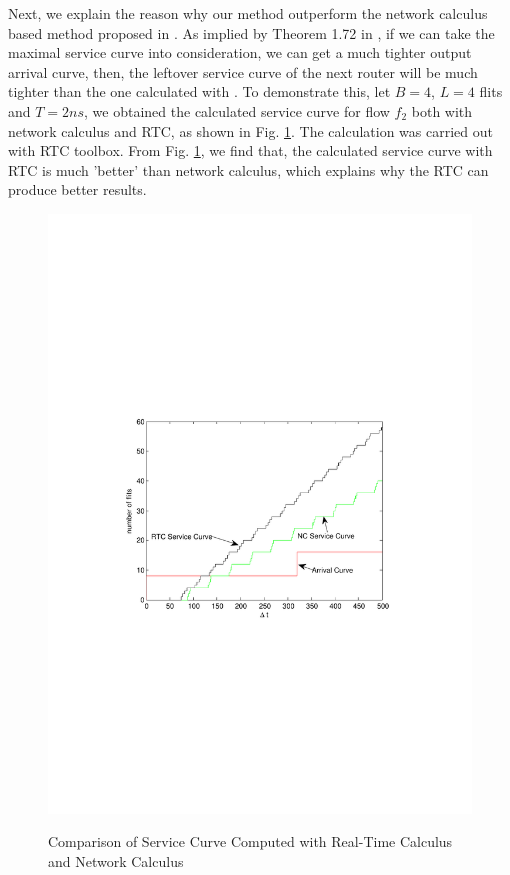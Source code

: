 \documentclass[10pt,journal]{IEEEtran}
\begin{document}
Next, we explain the reason why our method outperform the network calculus based method proposed in \cite{Qian489900}. As implied by Theorem 1.72 in \cite{Boudec2001Network}, if we can take the maximal service curve into consideration, we can get a much tighter output arrival curve, then, the leftover service curve of the next router will be much tighter than the one calculated with \cite{qian2009analysis}. To demonstrate this, let $B=4$, $L=4$ flits and $T=2ns$, we obtained the calculated service curve for flow $f_2$ both with network calculus and RTC, as shown in Fig. \ref{loose}. The calculation was carried out with RTC toolbox. From Fig. \ref{loose}, we find that, the calculated service curve with RTC is much 'better' than network calculus, which explains why the RTC can produce better results.
\begin{figure}
  \centering
  \includegraphics[scale=0.6]{figures/loose.pdf}\\
  \caption{Comparison of Service Curve Computed with Real-Time Calculus and Network Calculus}\label{loose}
\end{figure}
\end{document}

